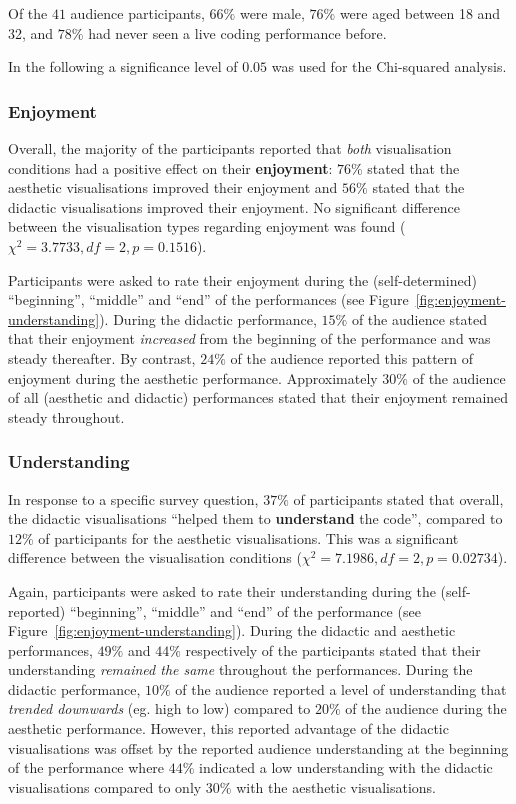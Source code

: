 \documentclass{sig-alternate}
\begin{document}
Of the $41$ audience participants, $66\%$ were male, $76\%$ were aged
between 18 and 32, and $78\%$ had never seen a live coding performance
before.

In the following a significance level of $0.05$ was used for the
Chi-squared analysis.

\subsubsection{Enjoyment}

Overall, the majority of the participants reported that \emph{both}
visualisation conditions had a positive effect on their
\textbf{enjoyment}: $76\%$ stated that the aesthetic visualisations
improved their enjoyment and $56\%$ stated that the didactic
visualisations improved their enjoyment. No significant difference
between the visualisation types regarding enjoyment was found
($\chi^2=3.7733,df=2,p=0.1516$).

Participants were asked to rate their enjoyment during the
(self-determined) ``beginning'', ``middle'' and ``end'' of the
performances {\color{red} (see Figure~\ref{fig:enjoyment-understanding})}. During
the didactic performance, $15\%$ of the audience stated that their
enjoyment \emph{increased} from the beginning of the performance and
was steady thereafter. By contrast, $24\%$ of the audience reported
this pattern of enjoyment during the aesthetic performance.
Approximately $30\%$ of the audience of all (aesthetic and didactic)
performances stated that their enjoyment remained steady throughout.

\subsubsection{Understanding}

In response to a specific survey question, $37\%$ of participants
stated that overall, the didactic visualisations ``helped them to
\textbf{understand} the code'', compared to $12\%$ of participants for
the aesthetic visualisations. This was a significant difference
between the visualisation conditions ($\chi^2=7.1986,df=2,p=0.02734$).

Again, participants were asked to rate their understanding during the
(self-reported) ``beginning'', ``middle'' and ``end'' of the
performance (see Figure~\ref{fig:enjoyment-understanding}). During the
didactic and aesthetic performances, $49\%$ and $44\%$ respectively of
the participants stated that their understanding \emph{remained the
same} throughout the performances. During the didactic performance,
$10\%$ of the audience reported a level of understanding that
\emph{trended downwards} (eg. high to low) compared to $20\%$ of the
audience during the aesthetic performance. However, this reported
advantage of the didactic visualisations was offset by the reported
audience understanding at the beginning of the performance where
$44\%$ indicated a low understanding with the didactic visualisations
compared to only $30\%$ with the aesthetic visualisations.
\end{document}
